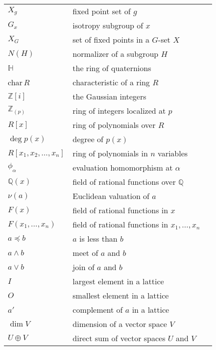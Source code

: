 \begin{center}
\begin{longtable}{llr}
%
$X_g$ & fixed point set of $g$ & \pageref{notefixed} \\
%
$G_x$ & isotropy subgroup of $x$ & \pageref{noteisotropy} \\
%
$X_G$ & set of fixed points in a $G$-set $X$ & \pageref{noteXG} \\
%
$N(H)$ & normalizer of a subgroup $H$ & \pageref{notenormalizer} \\
%
${\mathbb H}$ & the ring of quaternions & \pageref{noteringH} \\
%
\mbox{char$\, R$} & characteristic of a ring $R$ & \pageref{ringchar} \\
%
${\mathbb Z}[i ]$ & the Gaussian integers & \pageref{gaussianintegers} \\
%
${\mathbb Z}_{(p)}$ & ring of integers localized at $p$ & \pageref{notelocalint} \\
%
$R[x]$ & ring of polynomials over $R$ & \pageref{polynomialring} \\
%
$\deg p(x)$ & degree of $p(x)$ & \pageref{polydegree} \\
%
$R[x_1, x_2, \ldots, x_n]$ & ring of polynomials in $n$ variables & \pageref{notepolynvar} \\
%
$\phi_{\alpha}$ & evaluation homomorphism at $\alpha$ & \pageref{noteevalhomo} \\
%
${\mathbb Q}(x)$ & field of rational functions over ${\mathbb Q}$ & \pageref{noteratpoly} \\
%
$\nu(a)$ & Euclidean valuation of $a$ & \pageref{notevaluation} \\
%
$F(x)$ & field of rational functions in $x$ & \pageref{noteratfun} \\
%
$F(x_1, \ldots, x_n)$ & field of rational functions in $x_1, \ldots, x_n$ & \pageref{noteratnvar} \\
%
$a \preceq b$ &  $a$ is less than $b$ & \pageref{lessthan} \\
%
$a \wedge b$ & meet of $a$ and $b$ & \pageref{meet} \\
%
$a \vee b$ & join of $a$ and $b$ & \pageref{join} \\
%
$I$ & largest element in a lattice & \pageref{notelargeposet} \\
%
$O$ & smallest element in a lattice & \pageref{notesmallposet} \\
%
$a'$ & complement of $a$ in a lattice &\pageref{notedlatticecomp}  \\
%
$\dim V$ & dimension of a vector space $V$ & \pageref{vectdim} \\
%
$U \oplus V$ & direct sum of vector spaces $U$ and $V$ & \pageref{notedirectsum} \\

\end{longtable}
\end{center}
